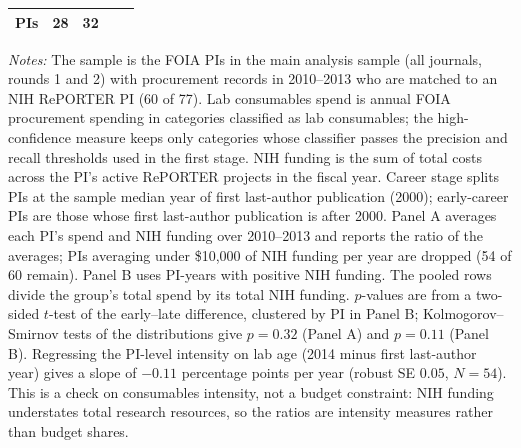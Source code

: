 \documentclass[11pt]{article}
\begin{document}
\begin{table}[htbp]
\begin{tabular}{@{}lrrrr@{}}
PIs                                               & 28   & 32   &      &      \\
\bottomrule
\end{tabular}
\par\vspace{0.5em}
\begin{minipage}{\textwidth}
\footnotesize
\textit{Notes:} The sample is the FOIA PIs in the main analysis sample
(all journals, rounds 1 and 2) with procurement records in 2010--2013 who are
matched to an NIH RePORTER PI (60 of 77). Lab consumables spend is annual FOIA
procurement spending in categories classified as lab consumables; the
high-confidence measure keeps only categories whose classifier passes the
precision and recall thresholds used in the first stage. NIH funding is the
sum of total costs across the PI's active RePORTER projects in the fiscal
year. Career stage splits PIs at the sample median year of first last-author
publication (2000); early-career PIs are those whose first last-author
publication is after 2000. Panel A averages each PI's spend and NIH funding
over 2010--2013 and reports the ratio of the averages; PIs averaging under
\$10,000 of NIH funding per year are dropped (54 of 60 remain). Panel B uses
PI-years with positive NIH funding. The pooled rows divide the group's total
spend by its total NIH funding. $p$-values are from a two-sided $t$-test of
the early--late difference, clustered by PI in Panel B; Kolmogorov--Smirnov
tests of the distributions give $p = 0.32$ (Panel A) and $p = 0.11$ (Panel B).
Regressing the PI-level intensity on lab age (2014 minus first last-author
year) gives a slope of $-0.11$ percentage points per year (robust SE $0.05$,
$N = 54$). This is a check on consumables intensity, not a budget constraint:
NIH funding understates total research resources, so the ratios are intensity
measures rather than budget shares.
\end{minipage}
\end{table}
\end{document}
